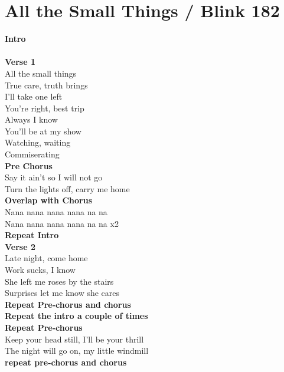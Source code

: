 \section{All the Small Things / Blink 182}\label{sec:allthesmallthings}
\Cmajor
\Gmajor
\Fmajor

\textbf{Intro}  \\
     \\
\textbf{Verse 1}\\
All the small things\\
True care, truth brings\\
I'll take one left\\
You're right, best trip\\
Always I know\\
You'll be at my show\\
Watching, waiting\\
Commiserating     \\
\textbf{Pre Chorus}\\
Say it ain't so I will not go\\
Turn the lights off, carry me home\\
\textbf{Overlap with Chorus}\\
Nana nana nana nana na na\\
Nana nana nana nana na na  x2\\
\textbf{Repeat Intro}\\
\textbf{Verse 2}\\
Late night, come home\\
Work sucks, I know\\
She left me roses by the stairs\\
Surprises let me know she cares\\
\textbf{Repeat Pre-chorus and chorus}\\
\textbf{Repeat the intro a couple of times}\\
\textbf{Repeat Pre-chorus}\\
Keep your head still, I'll be your thrill\\
The night will go on, my little windmill\\
\textbf{repeat pre-chorus and chorus}

